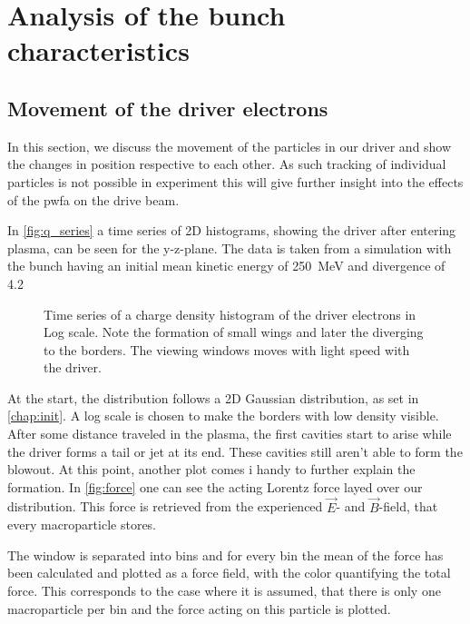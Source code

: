 \documentclass[bachelor_thesis]{subfiles}
\begin{document}
\chapter{Analysis of the bunch characteristics}
\section{Movement of the driver electrons}
In this section, we discuss the movement of the particles in our driver and show the changes in position respective to each other. As such tracking of individual particles is not possible in experiment
this will give further insight into the effects of the \gls{pwfa} on the drive beam.

In \autoref{fig:q_series} a time series of 2D histograms, showing the driver after entering plasma, can be seen for the y-z-plane. The data is taken from a simulation with the bunch having an initial mean kinetic energy of \qty{250}{\MeV} and divergence of \qty{4.2}{\mrad} 
\begin{figure}
	\centering
	\missingfigure{}
	\caption{Time series of a charge density histogram of the driver electrons in Log scale. Note the formation of small wings and later the diverging to the borders. The viewing windows moves with light speed with the driver.}
	\label{fig:q_series}
\end{figure}
At the start, the distribution follows a 2D Gaussian distribution, as set in \autoref{chap:init}. A log scale is chosen to make the borders with low density visible. After some distance traveled in the plasma, 
the first cavities start to arise while the driver forms a tail or jet at its end. These cavities still aren't able to form the blowout. At this point, another plot comes i handy to further explain the formation.
 In \autoref{fig:force} one can see the acting Lorentz force layed over our distribution. This force is retrieved from the experienced $\vec{E}$- and $\vec{B}$-field, that every macroparticle stores.
\begin{figure}
	\centering
	\missingfigure{}
	\caption{}
	\label{fig:force}
\end{figure}
The window is separated into bins and for every bin the mean of the force has been calculated and plotted as a force field, with the color quantifying the total force. This corresponds to the case where it is assumed, that there is only one macroparticle per bin and 
the force acting on this particle is plotted.
\end{document}

